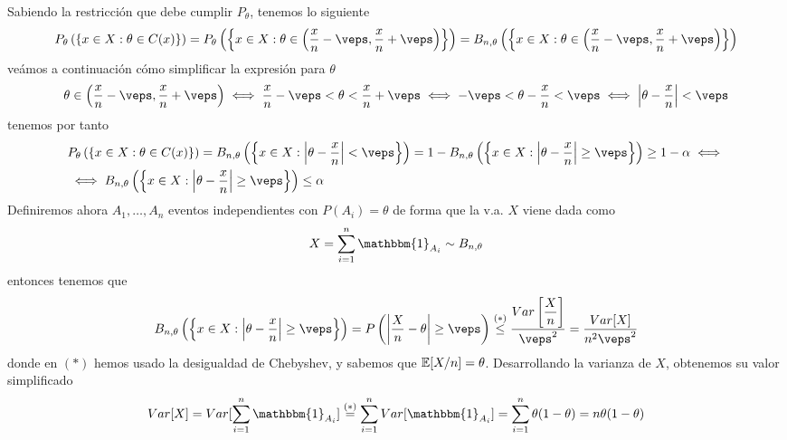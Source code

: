 \noindent
{} Sabiendo la restricción que debe cumplir $P_{\theta}$, tenemos lo siguiente
\begin{align*}
    P_{\theta}\left(\left\{x \in X : \theta \in C(x)\right\}\right) = P_{\theta}\left(\left\{x \in X : \theta \in \left(\dfrac{x}{n} -\veps, \dfrac{x}{n} + \veps\right)\right\}\right) = B_{n,\theta}\left(\left\{x \in X : \theta\in \left( \dfrac{x}{n} -\veps, \dfrac{x}{n} + \veps\right)\right\}\right) 
\end{align*}
\noindent
veámos a continuación cómo simplificar la expresión para $\theta$
\begin{align*}
    \theta \in \left(\dfrac{x}{n} -\veps, \dfrac{x}{n} + \veps\right) \iff \dfrac{x}{n} - \veps < \theta < \dfrac{x}{n} + \veps \iff -\veps < \theta - \dfrac{x}{n} < \veps \iff \left|\theta - \dfrac{x}{n}\right| < \veps
\end{align*}
tenemos por tanto 
\begin{align*}
    & P_{\theta}\left(\left\{x \in X : \theta \in C(x)\right\}\right) = B_{n,\theta}\left(\left\{x \in X : \left|\theta - \dfrac{x}{n}\right| < \veps\right\}\right) = 1-B_{n,\theta}\left(\left\{x \in X : \left|\theta - \dfrac{x}{n}\right| \geq \veps\right\}\right)\geq 1-\alpha \iff \\
    & \iff B_{n,\theta}\left(\left\{x \in X : \left|\theta - \dfrac{x}{n}\right| \geq \veps\right\}\right) \leq \alpha
\end{align*}
Definiremos ahora $A_1, \ldots, A_n$ eventos independientes con $P(A_i)=\theta$ de forma que la v.a. $X$ viene dada como
\begin{equation*}
    X = \sum\limits_{i=1}^{n} \mathbbm{1}_{A_i} \sim B_{n,\theta} 
\end{equation*}
entonces tenemos que
\begin{equation*}
    B_{n,\theta}\left(\left\{x \in X : \left|\theta - \dfrac{x}{n}\right| \geq \veps\right\}\right) = P\left(\left|\dfrac{X}{n} - \theta\right| \geq \veps\right) \overset{(*)}{\leq} \dfrac{Var\left[\dfrac{X}{n}\right]}{\veps^2}= \dfrac{Var[X]}{n^2 \veps^2} 
\end{equation*}
donde en $(*)$ hemos usado la desigualdad de Chebyshev, y sabemos que $\mathbb{E}[X/n] = \theta$. Desarrollando la varianza de $X$, obtenemos su valor simplificado
\begin{equation*}
    Var[X]=Var[\sum\limits_{i=1}^{n} \mathbbm{1}_{A_i}] \overset{(*)}{=}\sum\limits_{i=1}^{n} Var[\mathbbm{1}_{A_i}] = \sum\limits_{i=1}^{n} \theta(1-\theta) = n \theta(1-\theta)
\end{equation*}
